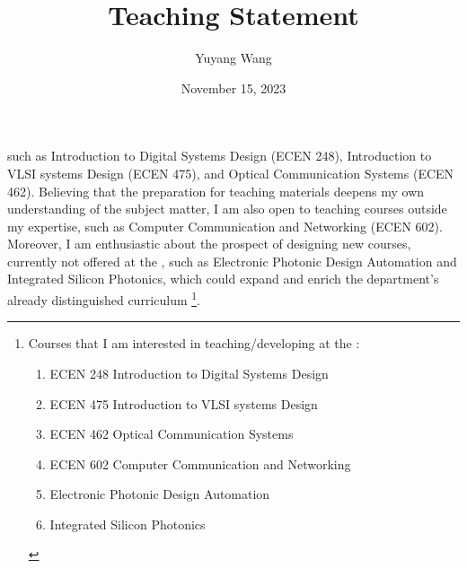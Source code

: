



\title{Teaching Statement}

\def\courseOneName{Introduction to Digital Systems Design}
\def\courseOneNumber{ECEN 248}
\def\courseTwoName{Introduction to VLSI systems Design}
\def\courseTwoNumber{ECEN 475}
\def\courseThreeName{Optical Communication Systems}
\def\courseThreeNumber{ECEN 462}
\def\courseFourName{Computer Communication and Networking}
\def\courseFourNumber{ECEN 602}
\def\courseSixName{Electronic Photonic Design Automation}
\def\courseSevenName{Integrated Silicon Photonics}

\def\rsCustom{%
such as \courseOneName{} (\courseOneNumber{}), \courseTwoName{} (\courseTwoNumber{}), and \courseThreeName{} (\courseThreeNumber{}). Believing that the preparation for teaching materials deepens my own understanding of the subject matter, I am also open to teaching courses outside my expertise, such as \courseFourName{} (\courseFourNumber{}). Moreover, I am enthusiastic about the prospect of designing new courses, currently not offered at the \appSchool{}, such as \courseSixName{} and \courseSevenName{}, which could expand and enrich the department's already distinguished curriculum%
\footnote[][-1.6in]{%
Courses that I am interested in teaching/developing at the \appDept{}:
\begin{enumerate}
    \item \courseOneNumber{} \courseOneName{}
    \item \courseTwoNumber{} \courseTwoName{}
    \item \courseThreeNumber{} \courseThreeName{}
    \item \courseFourNumber{} \courseFourName{}
    \item \courseSixName{}
    \item \courseSevenName{}
\end{enumerate}
}.
}

\author{Yuyang Wang}
\date{November 15, 2023}
\makeatletter
\fancyfoot[L]{\scshape \MakeLowercase{\@author}}
\fancyfoot[R]{{\scshape \MakeLowercase{\@title}}\quad{\fontsize{16}{20}\selectfont\sfrac{\thepage}{\pageref*{LastPage}}}\hspace{0.25in}}
\makeatother



\maketitle%


\rsCustom{}


\footnotesize
{}

